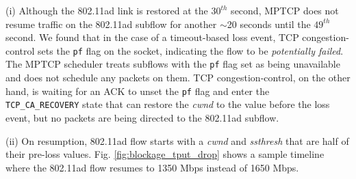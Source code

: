 \noindent(i) Although the 802.11ad link is restored at the $30^{th}$
second, MPTCP does not resume traffic on the 802.11ad subflow for
another $\sim$20 seconds until the $49^{th}$ second. We found that in
the case of a timeout-based loss event, TCP congestion-control sets
the {\tt pf} flag on the socket, indicating the flow to be
\emph{potentially failed}. The MPTCP scheduler treats subflows with
the {\tt pf} flag set as being unavailable and does not schedule any
packets on them. TCP congestion-control, on the other hand, is waiting
for an ACK to unset the {\tt pf} flag and enter the {\tt
  TCP\_CA\_RECOVERY} state that can restore the \emph{cwnd} to the
value before the loss event, but no packets are being directed to
the 802.11ad subflow.

\noindent(ii) On
resumption, 802.11ad flow starts with a \emph{cwnd} and
\emph{ssthresh} that are half of their pre-loss
values. Fig. \ref{fig:blockage_tput_drop} shows a sample timeline
where the 802.11ad flow resumes to 1350 Mbps instead of 1650
Mbps. 
